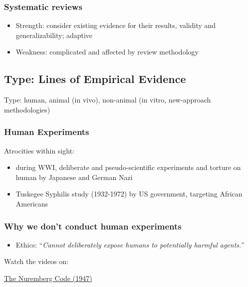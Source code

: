 \documentclass[
  letterpaper,
  DIV=11,
  numbers=noendperiod]{scrartcl}
\providecommand{\tightlist}{%
  \setlength{\itemsep}{0pt}\setlength{\parskip}{0pt}}\usepackage{longtable,booktabs,array}
\begin{document}
\subsubsection{Systematic reviews}\label{systematic-reviews}

\begin{itemize}
\item
  Strength: consider existing evidence for their results, validity and
  generalizability; adaptive
\item
  Weakness: complicated and affected by review methodology
\end{itemize}

\subsection{Type: Lines of Empirical
Evidence}\label{type-lines-of-empirical-evidence}

Type: human, animal (in vivo), non-animal (in vitro, new-approach
methodologies)

\subsubsection{Human Experiments}\label{human-experiments}

Atrocities within sight:

\begin{itemize}
\item
  during WWI, deliberate and pseudo-scientific experiments and torture
  on human by Japanese and German Nazi
\item
  Tuskegee Syphilis study (1932-1972) by US government, targeting
  African Americans
\end{itemize}

\subsubsection{Why we don't conduct human
experiments}\label{why-we-dont-conduct-human-experiments}

\begin{itemize}
\tightlist
\item
  Ethics: ``\emph{Cannot deliberately expose humans to potentially
  harmful agents.}''
\end{itemize}

Watch the videos on:

\href{https://youtu.be/_oZAPk_Xpow?si=XIJO6INIEd5m6HqC}{The Nuremberg
Code (1947)}
\end{document}
